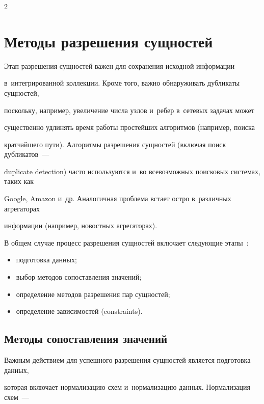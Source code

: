 \begin{multicols}{2}
\section{Методы разрешения сущностей}



  Этап разрешения сущностей важен для сохранения исходной информации

в~интегрированной коллекции. Кроме того, важно обнаруживать дуб\-ли\-ка\-ты сущностей,

поскольку, например, увеличение числа узлов и~ребер в~сетевых задачах может

существенно удлинять время работы простейших алгоритмов (например, поиска

кратчайшего пути). Алгоритмы разрешения сущностей (включая поиск дубликатов~---

duplicate detection) часто используются и~во всевозможных поисковых системах, таких как

Google, Amazon и~др. Аналогичная проблема встает остро в~различных агрегаторах

информации (например, новостных агрегаторах).



В общем случае процесс разрешения сущностей включает следующие этапы~\cite{8-vov}:

\begin{itemize}

\item подготовка данных;

\item выбор методов сопоставления значений;

\item определение методов разрешения пар сущностей;

\item определение зависимостей (constraints).

\end{itemize}



  \subsection{Методы сопоставления значений}



  Важным действием для успешного разрешения сущностей является подготовка данных,

которая включает нормализацию схем и~нормализацию данных. Нормализация схем~---


\end{multicols}
